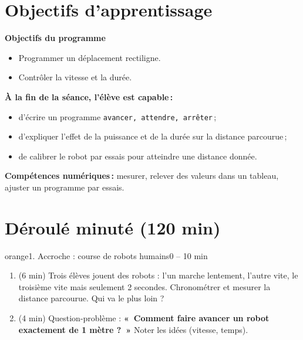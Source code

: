 \documentclass[11pt,a4paper]{article}
\begin{document}
\section{Objectifs d'apprentissage}
\begin{tcolorbox}[colback=gray!8,colframe=gray!60!black,arc=1mm,boxrule=0.5pt]
\textbf{Objectifs du programme}
\begin{itemize}
 \item Programmer un déplacement rectiligne.
 \item Contrôler la vitesse et la durée.
\end{itemize}
\textbf{À la fin de la séance, l'élève est capable\,:}
\begin{itemize}
 \item d'écrire un programme \texttt{avancer, attendre, arrêter}\,;
 \item d'expliquer l'effet de la puissance et de la durée sur la distance parcourue\,;
 \item de calibrer le robot par essais pour atteindre une distance donnée.
\end{itemize}
\textbf{Compétences numériques\,:} mesurer, relever des valeurs dans un tableau, ajuster un programme par essais.
\end{tcolorbox}

\section{Déroulé minuté (120 min)}

\begin{etape}{orange}{1. Accroche : course de robots humains}{0 -- 10 min}
\begin{enumerate}
 \item (6 min) Trois élèves jouent des robots : l'un marche lentement, l'autre vite, le troisième vite mais seulement 2 secondes. Chronométrer et mesurer la distance parcourue. Qui va le plus loin ?
 \item (4 min) Question-problème : \textbf{«~Comment faire avancer un robot exactement de 1 mètre ?~»} Noter les idées (vitesse, temps).
\end{enumerate}
\end{etape}
\end{document}
